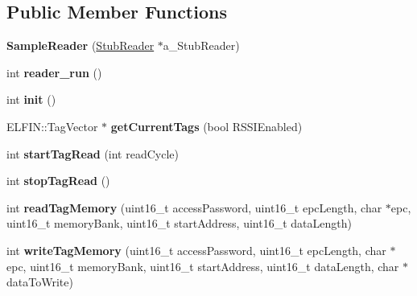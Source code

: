 \subsection*{Public Member Functions}
\begin{DoxyCompactItemize}
\item 
\hypertarget{class_e_l_f_i_n_1_1_sample_reader_a8c6be253e99d38fdcb6f0ef47f26b912}{{\bfseries Sample\-Reader} (\hyperlink{class_e_l_f_i_n_1_1_stub_reader}{Stub\-Reader} $\ast$a\-\_\-\-Stub\-Reader)}\label{class_e_l_f_i_n_1_1_sample_reader_a8c6be253e99d38fdcb6f0ef47f26b912}

\item 
\hypertarget{class_e_l_f_i_n_1_1_sample_reader_a32720e4992fd429d7b4f49dd12fc4935}{int {\bfseries reader\-\_\-run} ()}\label{class_e_l_f_i_n_1_1_sample_reader_a32720e4992fd429d7b4f49dd12fc4935}

\item 
\hypertarget{class_e_l_f_i_n_1_1_sample_reader_aab6ac797b23992dc9166a1c9d5189964}{int {\bfseries init} ()}\label{class_e_l_f_i_n_1_1_sample_reader_aab6ac797b23992dc9166a1c9d5189964}

\item 
\hypertarget{class_e_l_f_i_n_1_1_sample_reader_adcab4d609917f956936515de05913662}{E\-L\-F\-I\-N\-::\-Tag\-Vector $\ast$ {\bfseries get\-Current\-Tags} (bool R\-S\-S\-I\-Enabled)}\label{class_e_l_f_i_n_1_1_sample_reader_adcab4d609917f956936515de05913662}

\item 
\hypertarget{class_e_l_f_i_n_1_1_sample_reader_a3037003d168280c0bb1b0139d47a286a}{int {\bfseries start\-Tag\-Read} (int read\-Cycle)}\label{class_e_l_f_i_n_1_1_sample_reader_a3037003d168280c0bb1b0139d47a286a}

\item 
\hypertarget{class_e_l_f_i_n_1_1_sample_reader_a20876f3b4c9057273e5d5348310d2b46}{int {\bfseries stop\-Tag\-Read} ()}\label{class_e_l_f_i_n_1_1_sample_reader_a20876f3b4c9057273e5d5348310d2b46}

\item 
\hypertarget{class_e_l_f_i_n_1_1_sample_reader_ade8eb062c16e2da1c6da377b8e28c3ae}{int {\bfseries read\-Tag\-Memory} (uint16\-\_\-t access\-Password, uint16\-\_\-t epc\-Length, char $\ast$epc, uint16\-\_\-t memory\-Bank, uint16\-\_\-t start\-Address, uint16\-\_\-t data\-Length)}\label{class_e_l_f_i_n_1_1_sample_reader_ade8eb062c16e2da1c6da377b8e28c3ae}

\item 
\hypertarget{class_e_l_f_i_n_1_1_sample_reader_abc78ffa18065a8883cbad180bf0aef3b}{int {\bfseries write\-Tag\-Memory} (uint16\-\_\-t access\-Password, uint16\-\_\-t epc\-Length, char $\ast$epc, uint16\-\_\-t memory\-Bank, uint16\-\_\-t start\-Address, uint16\-\_\-t data\-Length, char $\ast$data\-To\-Write)}\label{class_e_l_f_i_n_1_1_sample_reader_abc78ffa18065a8883cbad180bf0aef3b}

\end{DoxyCompactItemize}
